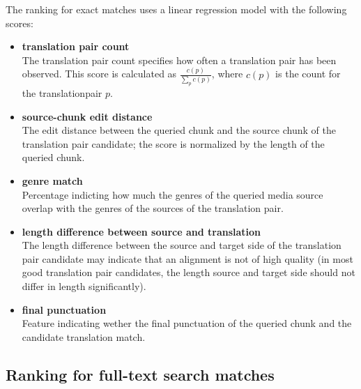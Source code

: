 The ranking for exact matches uses a linear regression model with the following scores:

\begin{itemize}
	\item \textbf{translation pair count}\\%
	The translation pair count specifies how often a translation pair has been observed. This score is calculated as $\frac{c(p)}{ \sum_p{c(p)}  } $, where $c(p)$ is the count for the translationpair $p$.
	
	\item \textbf{source-chunk edit distance}\\
	The edit distance between the queried chunk and the source chunk of the translation pair candidate; the score is normalized by the length of the queried chunk.
	
	\item \textbf{genre match}\\
	Percentage indicting how much the genres of the queried media source overlap with the genres of the sources of the translation pair.

	\item \textbf{length difference between source and translation}\\
	The length difference between the source and target side of the translation pair candidate may indicate that an alignment is not of high quality (in most good translation pair candidates,  the length source and target side should not differ in length significantly).
	
	\item \textbf{final punctuation}\\
	Feature indicating wether the final punctuation of the queried chunk and the candidate translation match.
	
	
	
\end{itemize}



\subsection{Ranking for full-text search matches}



